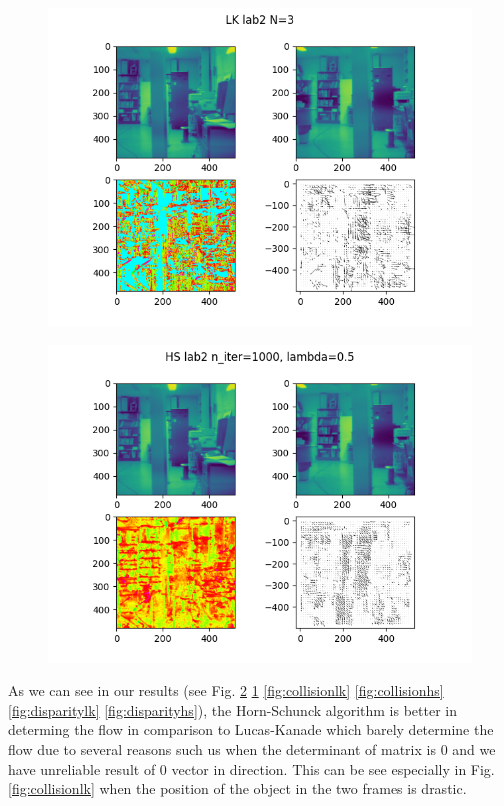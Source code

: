 \documentclass[9pt]{IEEEtran}
\begin{document}
\begin{figure}[h]
    \centering
    \includegraphics[width=1\columnwidth]{lab2lk.png}
    \label{fig:lab2lk}
\end{figure}
\begin{figure}[h]
    \centering
    \includegraphics[width=1\columnwidth, scale=0.5]{lab2hs.png}
    \label{fig:lab2hs}
\end{figure}

As we can see in our results (see Fig. \ref{fig:lab2hs} \ref{fig:lab2lk} \ref{fig:collisionlk} \ref{fig:collisionhs} \ref{fig:disparitylk} \ref{fig:disparityhs}), the Horn-Schunck algorithm is better in determing the flow in comparison to Lucas-Kanade which barely determine the flow due to several reasons such us when the determinant of matrix is 0 and we have unreliable result of 0 vector in direction.
This can be see especially in Fig. \ref{fig:collisionlk} when the position of the object in the two frames is drastic.
\end{document}
